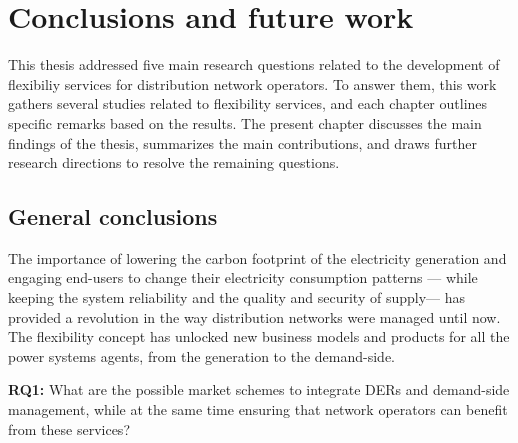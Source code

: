 
\chapter{Conclusions and future work}
\label{conclus}
   This thesis addressed five main research questions related to the development of flexibiliy services for distribution network operators. To answer them, this work gathers several studies related to flexibility services, and each chapter outlines specific remarks based on the results. The present chapter discusses the main findings of the thesis, summarizes the main contributions, and draws further research directions to resolve the remaining questions. 

\section{General conclusions}
The importance of lowering the carbon footprint of the electricity generation and engaging end-users to change their electricity consumption patterns --- while keeping the system reliability and the quality and security of supply--- has provided a revolution in the way distribution networks were managed until now. The flexibility concept has unlocked new business models and products for all the power systems agents, from the generation to the demand-side.


\begin{tcolorbox}
\textbf{RQ1:} What are the possible market schemes to integrate DERs and demand-side management, while at the same time ensuring that network operators can benefit from these services?  
\end{tcolorbox}

